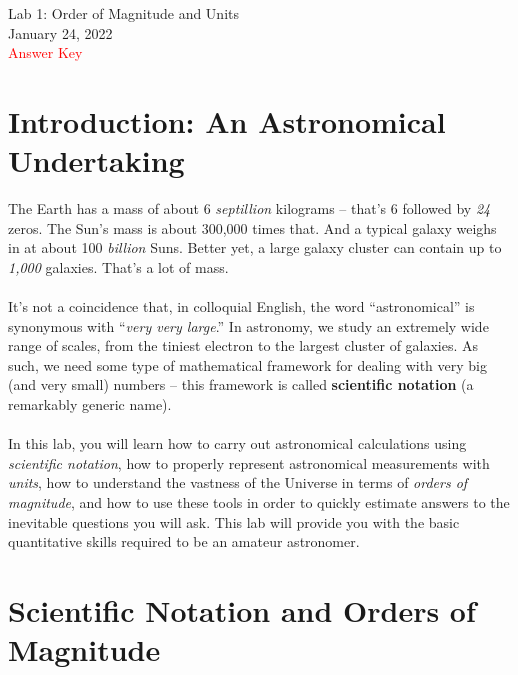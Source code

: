 \documentclass[11pt]{article}
\begin{document}
\begin{center}
\huge{Lab 1: Order of Magnitude and Units}\\ \medskip \Large{January 24, 2022}
\\ \medskip \Large{\textcolor{red}{Answer Key}}
\end{center}


\section{Introduction: An Astronomical Undertaking}

The Earth has a mass of about 6 \emph{septillion} kilograms -- that's 6 followed by \emph{24} zeros. The Sun's mass is about 300,000 times that. And a typical galaxy weighs in at about 100 \emph{billion} Suns. Better yet, a large galaxy cluster can contain up to \emph{1,000} galaxies. That's a lot of mass.
\\ \\ \noindent
It's not a coincidence that, in colloquial English, the word ``astronomical'' is synonymous with ``\emph{very very large}.'' In astronomy, we study an extremely wide range of scales, from the tiniest electron to the largest cluster of galaxies. As such, we need some type of mathematical framework for dealing with very big (and very small) numbers -- this framework is called \textbf{scientific notation} (a remarkably generic name). 
\\ \\ \noindent
In this lab, you will learn how to carry out astronomical calculations using \emph{scientific notation}, how to properly represent astronomical measurements with \emph{units}, how to understand the vastness of the Universe in terms of \emph{orders of magnitude}, and how to use these tools in order to quickly estimate answers to the inevitable questions you will ask. This lab will provide you with the basic quantitative skills required to be an amateur astronomer.

\section{Scientific Notation and Orders of Magnitude}
\end{document}
